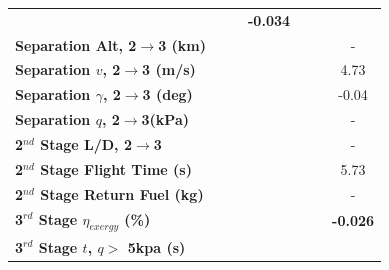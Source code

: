 \begin{table}[ht]
\begin{tabular}{l c c c c c c}
	& \textbf{\secondExergyEffmFuelOneHundredFive}
	& \textbf{\secondExergyEffmFuelOneHundredTen}
	& \textbf{-0.034}
	\\
	\textbf{Separation Alt, 2$\rightarrow$3 (km)}
	& \secondthirdSeparationAltmFuelNinety
	& \secondthirdSeparationAltmFuelNinetyFive
	& \secondthirdSeparationAltmFuelStandard
	& \secondthirdSeparationAltmFuelOneHundredFive
	& \secondthirdSeparationAltmFuelOneHundredTen
	& -
	\\
	\textbf{Separation $v$, 2$\rightarrow$3 (m/s)}
	& \secondthirdSeparationvmFuelNinety
	& \secondthirdSeparationvmFuelNinetyFive
	& \secondthirdSeparationvmFuelStandard
	& \secondthirdSeparationvmFuelOneHundredFive
	& \secondthirdSeparationvmFuelOneHundredTen
	&4.73
	\\
	\textbf{Separation $\gamma$, 2$\rightarrow$3 (deg)}
	& \secondthirdSeparationgammamFuelNinety
	& \secondthirdSeparationgammamFuelNinetyFive
	& \secondthirdSeparationgammamFuelStandard
	& \secondthirdSeparationgammamFuelOneHundredFive
	& \secondthirdSeparationgammamFuelOneHundredTen
	&-0.04
	\\
	\textbf{Separation $q$, 2$\rightarrow$3(kPa)}
	& \secondthirdSeparationqmFuelNinety
	& \secondthirdSeparationqmFuelNinetyFive
	& \secondthirdSeparationqmFuelStandard
	& \secondthirdSeparationqmFuelOneHundredFive
	& \secondthirdSeparationqmFuelOneHundredTen
	& -
	\\
	\textbf{2$^{nd}$ Stage L/D, 2$\rightarrow$3}
	& \secondthirdSeparationLDmFuelNinety
	& \secondthirdSeparationLDmFuelNinetyFive
	& \secondthirdSeparationLDmFuelStandard
	& \secondthirdSeparationLDmFuelOneHundredFive
	& \secondthirdSeparationLDmFuelOneHundredTen
	& -
	\\
	\textbf{2$^{nd}$ Stage Flight Time (s)}
	& \secondFlightTimemFuelNinety
	& \secondFlightTimemFuelNinetyFive
	& \secondFlightTimemFuelStandard
	& \secondFlightTimemFuelOneHundredFive
	& \secondFlightTimemFuelOneHundredTen
	&5.73
	\\
	\textbf{2$^{nd}$ Stage Return Fuel (kg)}
	& \returnFuelmFuelNinety
	& \returnFuelmFuelNinetyFive
	& \returnFuelmFuelStandard
	& \returnFuelmFuelOneHundredFive
	& \returnFuelmFuelOneHundredTen
	& -
	\\
	\hline 
	\textbf{3$^{rd}$ Stage $\eta_{exergy}$ (\%)}
	& \textbf{\thirddExergyEffmFuelNinety}
	& \textbf{\thirddExergyEffmFuelNinetyFive}
	& \textbf{\thirddExergyEffmFuelStandard}
	& \textbf{\thirddExergyEffmFuelOneHundredFive}
	& \textbf{\thirddExergyEffmFuelOneHundredTen}
	& \textbf{-0.026}
	\\
	\textbf{3$^{rd}$ Stage $t$, $q >$ 5kpa (s)}

\end{tabular}
\end{table}
